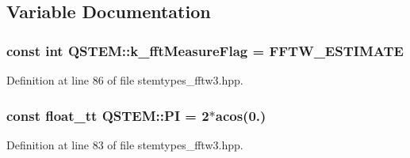 \subsection{Variable Documentation}
\hypertarget{namespace_q_s_t_e_m_a0032f41cd55b94be17d3c9dda2fc9012}{
\subsubsection[{k\-\_\-fft\-Measure\-Flag}]{\setlength{\rightskip}{0pt plus 5cm}const int Q\-S\-T\-E\-M\-::k\-\_\-fft\-Measure\-Flag = {\bf F\-F\-T\-W\-\_\-\-E\-S\-T\-I\-M\-A\-T\-E}}}\label{namespace_q_s_t_e_m_a0032f41cd55b94be17d3c9dda2fc9012}


Definition at line 86 of file stemtypes\-\_\-fftw3.\-hpp.

\hypertarget{namespace_q_s_t_e_m_a78cee406c660e4fe36e7ab36e34f1dec}{
\subsubsection[{P\-I}]{\setlength{\rightskip}{0pt plus 5cm}const {\bf float\-\_\-tt} Q\-S\-T\-E\-M\-::\-P\-I = 2$\ast$acos(0.)}}\label{namespace_q_s_t_e_m_a78cee406c660e4fe36e7ab36e34f1dec}


Definition at line 83 of file stemtypes\-\_\-fftw3.\-hpp.

